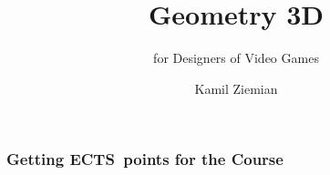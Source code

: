 \documentclass[10pt,t]{beamer}
\title{Geometry 3D}
\subtitle{for Designers of Video Games}
\author{Kamil Ziemian \\
  \email}
\begin{document}





\RaggedRight





\maketitle





















\begin{frame}
  \frametitle{Getting ECTS~points for the Course}




\end{frame}














\end{document}
